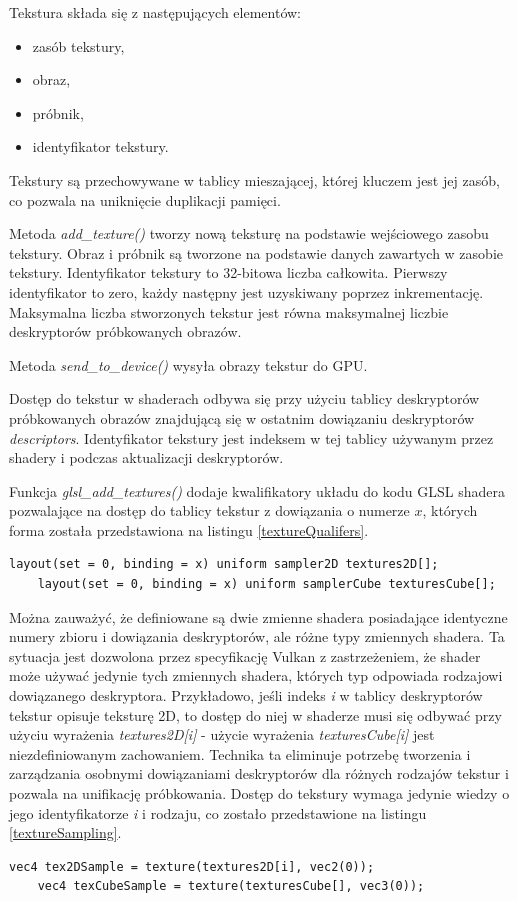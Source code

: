 Tekstura składa się z następujących elementów:
\begin{itemize}
	\item zasób tekstury,
	\item obraz,
	\item próbnik,
	\item identyfikator tekstury.
\end{itemize}
Tekstury są przechowywane w tablicy mieszającej, której kluczem jest jej zasób, co pozwala na uniknięcie duplikacji pamięci.

Metoda \textit{add\_texture()} tworzy nową teksturę na podstawie wejściowego zasobu tekstury.
Obraz i próbnik są tworzone na podstawie danych zawartych w zasobie tekstury.
Identyfikator tekstury to 32-bitowa liczba całkowita. Pierwszy identyfikator to zero, każdy następny jest uzyskiwany poprzez inkrementację. Maksymalna liczba stworzonych tekstur jest równa maksymalnej liczbie deskryptorów próbkowanych obrazów.

Metoda \textit{send\_to\_device()} wysyła obrazy tekstur do GPU. 

Dostęp do tekstur w shaderach odbywa się przy użyciu tablicy deskryptorów próbkowanych obrazów znajdującą się w ostatnim dowiązaniu deskryptorów \textit{descriptors}.
Identyfikator tekstury jest indeksem w tej tablicy używanym przez shadery i podczas aktualizacji deskryptorów.

Funkcja \textit{glsl\_add\_textures()} dodaje kwalifikatory układu do kodu GLSL shadera pozwalające na dostęp do tablicy tekstur z dowiązania o numerze $x$, których forma została przedstawiona na listingu \ref{textureQualifers}.
\lstset{language=GLSL}
\begin{lstlisting}[caption={Kwalifikatory układu dla tekstur \textit{textures}},captionpos=b,label={textureQualifers}]
	layout(set = 0, binding = x) uniform sampler2D textures2D[];
	layout(set = 0, binding = x) uniform samplerCube texturesCube[];
\end{lstlisting}
Można zauważyć, że definiowane są dwie zmienne shadera posiadające identyczne numery zbioru i dowiązania deskryptorów, ale różne typy zmiennych shadera.
Ta sytuacja jest dozwolona przez specyfikację Vulkan z zastrzeżeniem, że shader może używać jedynie tych zmiennych shadera, których typ odpowiada rodzajowi dowiązanego deskryptora.
Przykładowo, jeśli indeks \textit{i} w tablicy deskryptorów tekstur opisuje teksturę 2D, to dostęp do niej w
shaderze musi się odbywać przy użyciu wyrażenia \textit{textures2D[i]} - użycie wyrażenia \textit{texturesCube[i]} jest niezdefiniowanym zachowaniem.
Technika ta eliminuje potrzebę tworzenia i zarządzania osobnymi dowiązaniami deskryptorów dla różnych rodzajów tekstur i pozwala na unifikację próbkowania. Dostęp do tekstury wymaga jedynie wiedzy o jego identyfikatorze \textit{i} i rodzaju, co zostało przedstawione na listingu \ref{textureSampling}.
\lstset{language=GLSL}
\begin{lstlisting}[caption={Przykład próbkowania tekstur},captionpos=b,label={textureSampling}]
	vec4 tex2DSample = texture(textures2D[i], vec2(0));
	vec4 texCubeSample = texture(texturesCube[], vec3(0));
\end{lstlisting}

